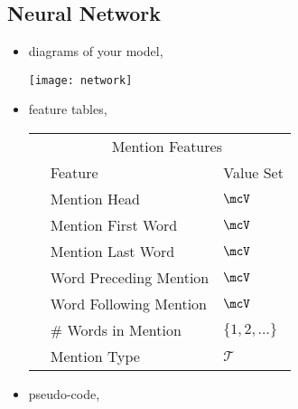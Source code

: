 \documentclass[11pt]{article}
\begin{document}
\subsection{Neural Network}

\begin{itemize}
\item diagrams of your model,

  \begin{center}
    \texttt{[image: network]}
  \end{center}
\item feature tables,

  \begin{center}
    \begin{tabular}{@{}lll@{}}
      \toprule
      &\multicolumn{2}{c}{Mention Features  } \\
      & Feature & Value Set\\
      \midrule
      & Mention Head & $\mcV$ \\
      & Mention First Word & $\mcV$ \\
      & Mention Last Word & $\mcV$ \\
      & Word Preceding Mention & $\mcV$ \\
      & Word Following Mention & $\mcV$\\
      & \# Words in Mention & $\{1, 2, \ldots \}$ \\
      & Mention Type & $\mathcal{T}$ \\
      \bottomrule
    \end{tabular}
  \end{center}

\item pseudo-code,

  \begin{algorithmic}[1]
    \EndFor{}
    \EndFor{}
    \EndFor{}
    \EndFor{}
    \EndProcedure{}
  \end{algorithmic}

\end{itemize}
\end{document}
